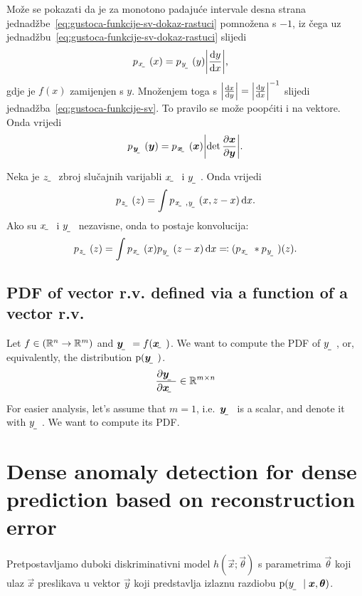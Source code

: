 \documentclass{article}
\begin{document}
Može se pokazati da je za monotono padajuće intervale desna strana jednadžbe~\eqref{eq:gustoca-funkcije-sv-dokaz-rastuci} pomnožena s $-1$, iz čega uz jednadžbu~\eqref{eq:gustoca-funkcije-sv-dokaz-rastuci} slijedi
\begin{align}
p_{\rvar x}(x) &= p_{\rvar y}(y)\envert{\od{y}{x}} \text{,} \label{eq:gustoca-funkcije-sv-dokaz-xy}
\end{align}
gdje je $f(x)$ zamijenjen s $y$. Množenjem toga s $\envert{\od{x}{y}}=\envert{\od{y}{x}}^{-1}$ slijedi jednadžba~\eqref{eq:gustoca-funkcije-sv}. To pravilo se može poopćiti i na vektore. Onda vrijedi \citep{Murphy:2012:MLPP}
\begin{align}
p_{\rvec y}(\vec y)=p_\rvec{x}(\vec x)\envert{\det\pd{\vec x}{\vec y}} \text{.}
\end{align}

Neka je $\rvar z$ zbroj slučajnih varijabli $\rvar x$ i $\rvar y$. Onda vrijedi
\begin{align}
	p_{\rvar z}(z) = \int p_{\rvar x,\rvar y}(x, z-x)\dif x \text{.}
\end{align}
Ako su $\rvar x$ i $\rvar y$ nezavisne, onda to postaje konvolucija:
\begin{align} \label{eq:nezavisne-gustoce-konvolucija}
p_{\rvar z}(z) = \int p_{\rvar x}(x)p_{\rvar y}(z-x)\dif x \eqqcolon (p_{\rvar x}*p_{\rvar y})(z) \text{.}
\end{align}

\subsection{PDF of vector r.v. defined via a function of a vector r.v.}

Let $f \in (\mathbb{R}^n\to\mathbb{R}^m)$ and $\rvec y = f(\rvec x)$. We want to compute the PDF of $\rvar y$, or, equivalently, the distribution $\p(\rvec y)$.
\begin{align}
    \pd{\rvec y}{\rvec x} \in \R^{m\times n}
\end{align}

For easier analysis, let's assume that $m=1$, i.e.\ $\rvec y$ is a scalar, and denote it with $\rvar y$. We want to compute its PDF.


\section{Dense anomaly detection for dense prediction based on reconstruction error}

Pretpostavljamo duboki diskriminativni model $h(\vec x;\vec\theta)$ s parametrima $\vec\theta$ koji ulaz $\vec x$ preslikava u vektor $\vec y$ koji predstavlja izlaznu razdiobu  $\p(\rvar y\mid \vec x, \vec\theta)$.
\end{document}
